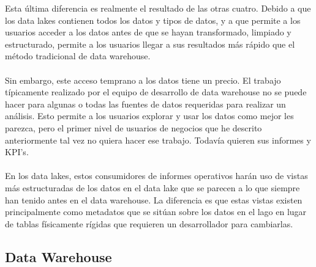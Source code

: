 \documentclass[11pt,a4paper]{article}
\begin{document}
\begin{enumerate}[A.]
				Esta última diferencia es realmente el resultado de las otras cuatro. Debido a que los data lakes contienen todos los datos y tipos de datos, y a que permite a los usuarios acceder a los datos antes de que se hayan transformado, limpiado y estructurado, permite a los usuarios llegar a sus resultados más rápido que el método tradicional de data warehouse.\\
				\\
				Sin embargo, este acceso temprano a los datos tiene un precio. El trabajo típicamente realizado por el equipo de desarrollo de data warehouse no se puede hacer para algunas o todas las fuentes de datos requeridas para realizar un análisis. Esto permite a los usuarios explorar y usar los datos como mejor les parezca, pero el primer nivel de usuarios de negocios que he descrito anteriormente tal vez no quiera hacer ese trabajo. Todavía quieren sus informes y KPI's.\\
				\\
				En los data lakes, estos consumidores de informes operativos harán uso de vistas más estructuradas de los datos en el data lake que se parecen a lo que siempre han tenido antes en el data warehouse. La diferencia es que estas vistas existen principalmente como metadatos que se sitúan sobre los datos en el lago en lugar de tablas físicamente rígidas que requieren un desarrollador para cambiarlas. \cite{DLake02:Online}
				
				
			\end{enumerate}
			
			
			\subsection{Data Warehouse}
			
\end{document}
